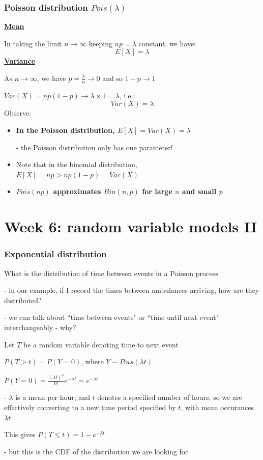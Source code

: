 \documentclass[t,8pt]{beamer}%
\begin{document}
\begin{frame}
	\frametitle{Poisson distribution $Pois(\lambda)$}
    {\bf\underline{Mean}} \par
    In taking the limit $n\rightarrow\infty$ keeping $np=\lambda$ constant, we have:
    $$E[X]=\lambda$$
    {\bf\underline{Variance}} \par
    As $n\rightarrow\infty$, we have $p=\frac{\lambda}n\rightarrow 0$ and so $1-p\rightarrow 1$ \par
    $Var(X)=np(1-p)\rightarrow\lambda\times 1=\lambda$, i.e.:
    $$Var(X)=\lambda$$
    Observe:
    \begin{itemize}
        \item {\bf In the Poisson distribution, $E[X]=Var(X)=\lambda$ \par
    - the Poisson distribution only has one parameter!}
    \item Note that in the binomial distribution, $E[X]=np>np(1-p)=Var(X)$
    \item {\bf $Pois(np)$ approximates $Bin(n,p)$ for large $n$ and small $p$}
    \end{itemize}
\end{frame}





\section{Week 6: random variable models II}
\begin{frame}
	\frametitle{Exponential distribution}
	What is the distribution of time between events in a Poisson process \par
	{\small\color{NavyBlue} - in our example, if I record the times between ambulances arriving, how are they distributed?\par
		- we can talk about ``time between events" or ``time until next event" interchangeably - why?}\par
	Let $T$ be a random variable denoting time to next event \par%
	$P(T>t)=P(Y=0)$, where $Y\sim Pois(\lambda t)$\par
	$P(Y=0)=\frac{(\lambda t)^0}{0!}e^{-\lambda t}=e^{-\lambda t}$\par
	{\small\color{NavyBlue} - $\lambda$ is a mean per hour, and $t$ denotes a specified number of hours, so we are effectively converting to a new time period specified by $t$, with mean occurances $\lambda t$}\par
	This gives $P(T\leq t)=1-e^{-\lambda t}$\par
	- but this is the CDF of the distribution we are looking for
\end{frame}
\end{document}
